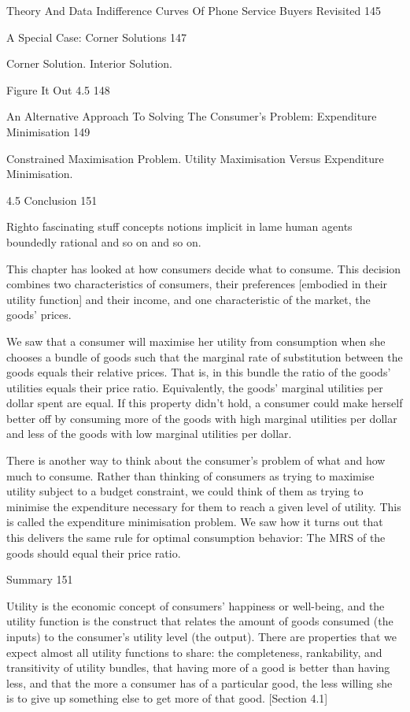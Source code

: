 Theory And Data Indifference Curves Of Phone Service Buyers Revisited 145



A Special Case: Corner Solutions 147

Corner Solution. Interior Solution.

Figure It Out 4.5 148



An Alternative Approach To Solving The Consumer's Problem: Expenditure Minimisation 149

Constrained Maximisation Problem. Utility Maximisation Versus Expenditure Minimisation.

4.5 Conclusion 151

Righto fascinating stuff concepts notions implicit in lame human agents boundedly rational and so on and so on.

This chapter has looked at how consumers decide what to consume. This decision combines two characteristics of consumers, their preferences [embodied in their utility function] and their income, and one characteristic of the market, the goods' prices.

We saw that a consumer will maximise her utility from consumption when she chooses a bundle of goods such that the marginal rate of substitution between the goods equals their relative prices. That is, in this bundle the ratio of the goods' utilities equals their price ratio. Equivalently, the goods' marginal utilities per dollar spent are equal. If this property didn't hold, a consumer could make herself better off by consuming more of the goods with high marginal utilities per dollar and less of the goods with low marginal utilities per dollar.

There is another way to think about the consumer's problem of what and how much to consume. Rather than thinking of consumers as trying to maximise utility subject to a budget constraint, we could think of them as trying to minimise the expenditure necessary for them to reach a given level of utility. This is called the expenditure minimisation problem. We saw how it turns out that this delivers the same rule for optimal consumption behavior: The MRS of the goods should equal their price ratio.

Summary 151

Utility is the economic concept of consumers' happiness or well-being, and the utility function is the construct that relates the amount of goods consumed (the inputs) to the consumer's utility level (the output). There are properties that we expect almost all utility functions to share: the completeness, rankability, and transitivity of utility bundles, that having more of a good is better than having less, and that the more a consumer has of a particular good, the less willing she is to give up something else to get more of that good. [Section 4.1]

